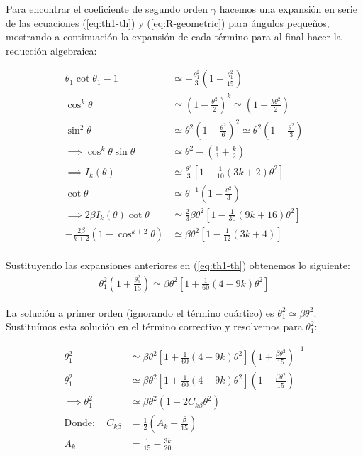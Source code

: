 Para encontrar el coeficiente de segundo orden $\gamma$ hacemos una expansión en serie de las ecuaciones (\ref{eq:th1-th}) y
(\ref{eq:R-geometric}) para ángulos pequeños, mostrando a continuación la expansión de cada término para al final hacer la
reducción algebraica:

\begin{align}
  \theta_1\cot\theta_1 -1 &\simeq -\frac{\theta^2_1}{3}\left(1 + \frac{\theta^2_1}{15}\right) \\
  \cos^k\theta &\simeq \left(1 - \frac{\theta^2}{2}\right)^k \simeq \left(1 - \frac{k\theta^2}{2}\right) \\
  \sin^2\theta &\simeq \theta^2\left(1 - \frac{\theta^2}{6}\right)^2 \simeq \theta^2\left(1 - \frac{\theta^2}{3}\right)\\
  \implies \cos^k\theta\sin\theta &\simeq \theta^2 - \left(\frac{1}{3} + \frac{k}{2}\right) \\
  \implies I_k(\theta) &\simeq \frac{\theta^3}{3}\left[1 - \frac{1}{10}\left(3k + 2\right)\theta^2\right] \\
  \cot\theta &\simeq \theta^{-1}\left(1 - \frac{\theta^2}{3}\right) \\
  \implies 2\beta I_k(\theta)\cot\theta &\simeq \frac{2}{3}\beta\theta^2\left[1 - \frac{1}{30}\left(9k + 16\right)\theta^2\right] \\
  -\frac{2\beta}{k+2}\left(1 - \cos^{k+2}\theta\right) &\simeq \beta\theta^2\left[1 - \frac{1}{12}\left(3k+4\right)\right] \\
\end{align}

Sustituyendo las expansiones anteriores en (\ref{eq:th1-th}) obtenemos lo siguiente:
\begin{align}
  \theta^2_1\left(1 + \frac{\theta^2_1}{15}\right) \simeq \beta\theta^2\left[1 + \frac{1}{60}\left(4 - 9k\right)\theta^2\right]
  \label{eq:th1-th-approx}
\end{align}

La solución a primer orden (ignorando el término cuártico) es $\theta^2_ 1 \simeq \beta\theta^2$. Sustituímos esta solución en el
término correctivo y resolvemos para $\theta^2_1$:

\begin{align}
  \theta^2_1 &\simeq \beta\theta^2\left[1 + \frac{1}{60}\left(4 - 9k\right)\theta^2\right]\left(1 + \frac{\beta\theta^2}{15}\right)^{-1} \\
  \theta^2_1 &\simeq \beta\theta^2\left[1 + \frac{1}{60}\left(4 - 9k\right)\theta^2\right]\left(1 - \frac{\beta\theta^2}{15}\right) \\
  \implies \theta^2_1 &\simeq \beta\theta^2\left(1 + 2C_{k\beta}\theta^2\right) \\
  \mathrm{Donde:\quad}C_{k\beta} &= \frac{1}{2}\left(A_k - \frac{\beta}{15}\right) \\
  A_k &= \frac{1}{15} - \frac{3k}{20}
\end{align}

